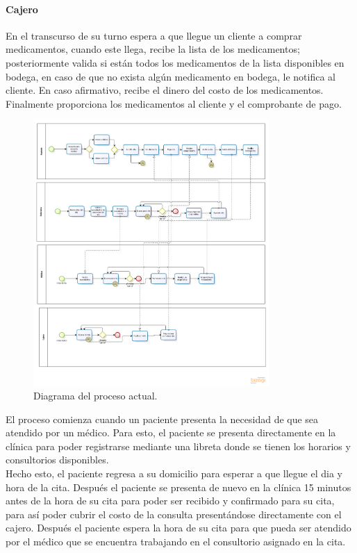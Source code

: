 	\paragraph{Cajero}
	En el transcurso de su turno espera a que llegue un cliente a comprar medicamentos, cuando este llega, recibe la lista de los medicamentos; posteriormente valida si están todos los medicamentos de la lista disponibles en bodega, en caso de que no exista algún medicamento en bodega, le notifica al cliente. En caso afirmativo, recibe el dinero del costo de los medicamentos. Finalmente proporciona los medicamentos al cliente y el comprobante de pago.
\iffalse
\begin{figure}[htbp!]
		\centering
			\includegraphics[width=0.8\textwidth]{images/Proceso_actual}
		\caption{Diagrama del proceso actual.}
	\end{figure}

El proceso comienza cuando un paciente presenta la necesidad de que sea atendido por un médico. Para esto, el paciente se presenta directamente en la clínica para poder registrarse mediante una libreta donde se tienen los horarios y consultorios disponibles.\\

Hecho esto, el paciente regresa a su domicilio para esperar a que llegue el dia y hora de la cita. Después el paciente se presenta de nuevo en la clínica 15 minutos antes de la hora de su cita para poder ser recibido y confirmado para su cita, para así poder cubrir el costo de la consulta presentándose directamente con el cajero. Después el paciente espera la hora de su cita para que pueda ser atendido por el médico que se encuentra trabajando en el consultorio asignado en la cita.\\

